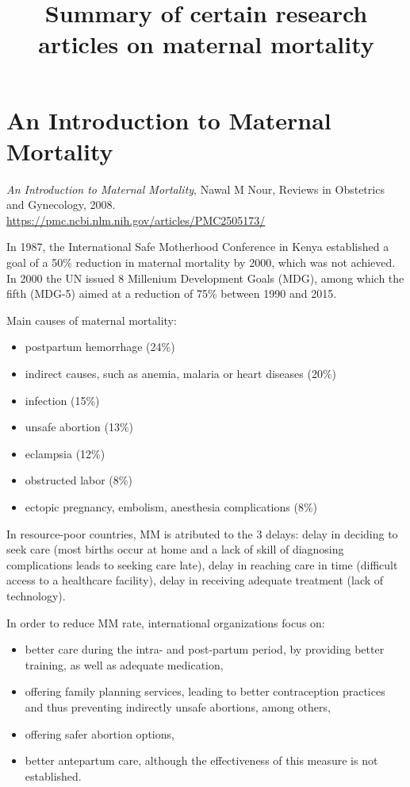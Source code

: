 \documentclass[a4paper,12pt]{article}
\title{Summary of certain research articles on maternal mortality}
\date{}
\author{}
\begin{document}
\maketitle


\section{An Introduction to Maternal Mortality}

\textit{An Introduction to Maternal Mortality}, Nawal M Nour, Reviews in Obstetrics and Gynecology, 2008.\\
\url{https://pmc.ncbi.nlm.nih.gov/articles/PMC2505173/}

In 1987, the International Safe Motherhood Conference in Kenya established a goal of a 50\% reduction in maternal mortality by 2000, which was not achieved. In 2000 the UN issued 8 Millenium Development Goals (MDG), among which the fifth (MDG-5) aimed at a reduction of 75\% between 1990 and 2015. 

Main causes of maternal mortality:
\begin{itemize}
\item postpartum hemorrhage (24\%)
\item indirect causes, such as anemia, malaria or heart diseases (20\%)
\item infection (15\%)
\item unsafe abortion (13\%)
\item eclampsia (12\%)
\item obstructed labor (8\%)
\item ectopic pregnancy, embolism, anesthesia complications (8\%)
\end{itemize}

In resource-poor countries, MM is atributed to the 3 delays: delay in deciding to seek care (most births occur at home and a lack of skill of diagnosing complications leads to seeking care late), delay in reaching care in time (difficult access to a healthcare facility), delay in receiving adequate treatment (lack of technology).

In order to reduce MM rate, international organizations focus on:
\begin{itemize}
\item better care during the intra- and post-partum period, by providing better training, as well as adequate medication,
\item offering family planning services, leading to better contraception practices and thus preventing indirectly unsafe abortions, among others,
\item offering safer abortion options,
\item better antepartum care, although the effectiveness of this measure is not established. 
\end{itemize}
\end{document}
